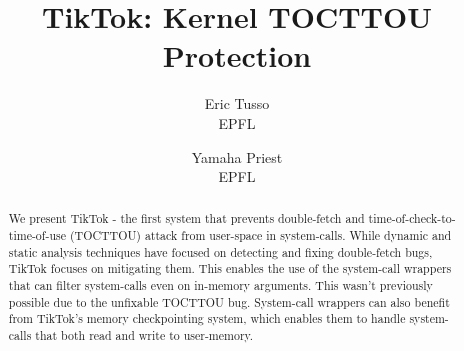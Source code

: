 \usepackage{listings}
\usepackage{parcolumns}
\usepackage{graphicx}
\usepackage{caption}
\usepackage{subcaption}
\usepackage{cleveref}

\newcommand{\pra}[1]{\textcolor{blue}{\textbf{PS:} #1}}
\newcommand{\nb}[1]{\textcolor{green}{\textbf{NB}: #1}}
\newcommand{\mat}[1]{\textcolor{red}{\textbf{Mat:} #1}}


\date{}

\title{\Large \bf TikTok: Kernel TOCTTOU Protection}

\author{
{\rm Eric Tusso}\\
EPFL
\and
{\rm Yamaha Priest}\\
EPFL
} %

\maketitle

\begin{abstract}
We present TikTok - the first system that prevents double-fetch and
time-of-check-to-time-of-use (TOCTTOU) attack from user-space in system-calls. While dynamic and
static analysis techniques have focused on detecting and fixing double-fetch
bugs, TikTok focuses on mitigating them. This enables the use of the system-call
wrappers that can filter system-calls even on in-memory arguments. This wasn't
previously possible due to the unfixable TOCTTOU bug. System-call wrappers can
also benefit from TikTok's memory checkpointing system, which enables them to handle
system-calls that both read and write to user-memory.


\end{abstract}

